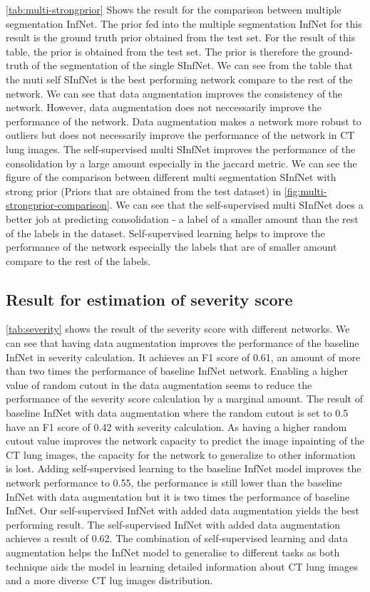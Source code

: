  \ref{tab:multi-strongprior} Shows the result for the comparison between multiple segmentation InfNet. The prior fed into the multiple segmentation InfNet for this result is the ground truth prior obtained from the test set. For the result of this table, the prior is obtained from the test set. The prior is therefore the ground-truth of the segmentation of the single SInfNet. 
 We can see from the table that the muti self SInfNet is the best performing network compare to the rest of the network. We can see that data augmentation improves the consistency of the network. However, data augmentation does not neccessarily improve the performance of the network. Data augmentation makes a network more robust to outliers but does not necessarily improve the performance of the network in CT lung images. The self-supervised multi SInfNet improves the performance of the consolidation by a large amount especially in the jaccard metric. We can see the figure of the comparison between different multi segmentation SInfNet with strong prior (Priors that are obtained from the test dataset) in \ref{fig:multi-strongprior-comparison}.
 We can see that the self-supervised multi SInfNet does a better job at predicting consolidation - a label of a smaller amount than the rest of the labels in the dataset. Self-supervised learning helps to improve the performance of the network especially the labels that are of smaller amount compare to the rest of the labels. 


\subsection{Result for estimation of severity score}
\ref{tab:severity} shows the result of the severity score with different networks. We can see that having data augmentation improves the performance of the baseline InfNet in severity calculation. It achieves an F1 score of 0.61,  an amount of more than two times the performance of baseline InfNet network. Enabling a higher value of random cutout in the data augmentation seems to reduce the performance of the severity score calculation by a marginal amount. The result of baseline InfNet with data augmentation where the random cutout is set to 0.5 have an F1 score of 0.42 with severity calculation. As having a higher random cutout value improves the network capacity to predict the image inpainting of the CT lung images, the capacity for the network to generalize to other information is lost. Adding self-supervised learning to the baseline InfNet model improves the network performance to 0.55, the performance is still lower than the baseline InfNet with data augmentation but it is two times the performance of baseline InfNet. Our self-supervised InfNet with added data augmentation yields the best performing result. The self-supervised InfNet with added data augmentation achieves a result of 0.62. The combination of self-supervised learning and data augmentation helps the InfNet model to generalise to different tasks as both technique aids the model in learning detailed information about CT lung images and a more diverse CT lug images distribution.